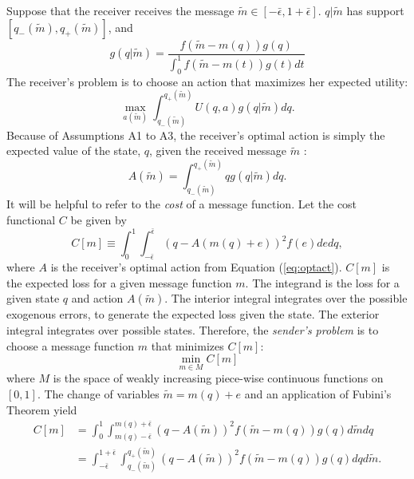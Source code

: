 \documentclass{article}
\begin{document}
Suppose that the receiver receives the message $\widetilde{m}\in [ - \bar{\epsilon},1+\bar{\epsilon}]$. $q|\widetilde{m}$ has support $[q_{-}( \widetilde{m}),q_{+}(\widetilde{m})]$, and 
\begin{equation} 
	g(q|\widetilde{m})=\frac{f(\widetilde{m}-m(q))g(q)}{\int_{0}^{1}{ f(\widetilde{m}-m(t))g(t)dt}}  \label{eq:posterior} 
\end{equation} 
The receiver's problem is to choose an action that maximizes her expected utility: 
\begin{equation} 
	\max_{a(\widetilde{m})}\int_{q_{-}(\widetilde{m})}^{q_{+}(\widetilde{m})}{U(q,a)g(q|\widetilde{m})}dq.  
\end{equation} 
Because of Assumptions A1 to A3, the receiver's optimal action is simply the expected value of the state, $q$, given the received message $\widetilde{m}$ : 
\begin{equation} 
	A(\widetilde{m})=\int_{q_{-}(\widetilde{m})}^{q_{+}(\widetilde{m})}{qg(q| \widetilde{m})}dq.  \label{eq:optact} 
\end{equation}
It will be helpful to refer to the \textit{cost }of a message function. Let the cost functional $C$ be given by 
\begin{equation}
	C[m]\equiv \int_{0}^{1}{\int_{-\bar{\epsilon}}^{\bar{\epsilon}}{(q-A(m(q)+e))^{2}f(e)de}dq},  
\end{equation}
where $A$ is the receiver's optimal action from Equation (\ref{eq:optact}). $C[m]$ is the expected loss for a given message function $m$. The integrand is the loss for a given state $q$ and action $A(\widetilde{m})$. The interior integral integrates over the possible exogenous errors, to generate the expected loss given the state. The exterior integral integrates over possible states. Therefore, the \textit{sender's problem} is to choose a message function $m$ that minimizes $C[m]$: 
\begin{equation}
	\min_{m\in M}C[m]
\end{equation}
where $M$ is the space of weakly increasing piece-wise continuous functions on $[0,1]$. The change of variables $\widetilde{m}=m(q)+e$ and an application of Fubini's Theorem yield 
\begin{align}
	C[m]& =\int_{0}^{1}{\int_{m(q)-\bar{\epsilon}}^{m(q)+\bar{\epsilon}}{(q-A( \widetilde{m}))^{2}f(\widetilde{m}-m(q))g(q)d\widetilde{m}}dq} \\
	& =\int_{-\bar{\epsilon}}^{1+\bar{\epsilon}}{\int_{q_{-}(\widetilde{m})}^{q_{+}(\widetilde{m})}{(q-A(\widetilde{m}))^{2}f(\widetilde{m}-m(q))g(q)dq}d\widetilde{m}}.
\end{align}
\end{document}
